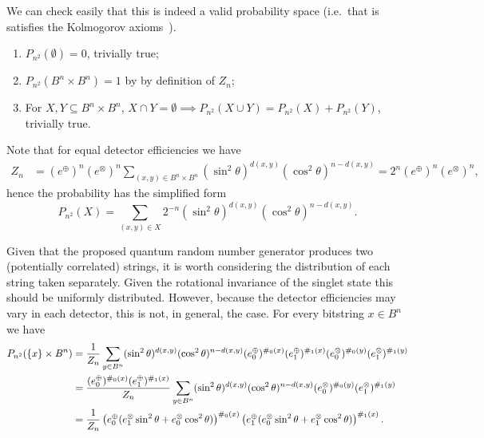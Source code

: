 \documentclass[%
 preprint,
 showpacs,
 showkeys,
 preprintnumbers,
  amsmath,amssymb,
  aps,
 pra,
  longbibliography,
  floatfix,
 ]{revtex4-1}
\newtheorem{Fact}[Theorem]{Fact}
\theoremstyle{definition}
\begin{document}
We can check easily that this is indeed a valid probability space (i.e.\ that is satisfies the Kolmogorov axioms~\cite{Billingsley:1979aa}).
\begin{enumerate}
	\item $P_{n^2}(\emptyset) = 0$, trivially true;
	\item $P_{n^2}(B^n\times B^n) = 1$ by by definition of $Z_n$;
	\item For $X,Y\subseteq B^n\times B^n$, $X\cap Y=\emptyset \implies P_{n^2}(X \cup Y) = P_{n^2}(X) + P_{n^2}(Y)$, trivially true.
\end{enumerate}
\fi
Note that for equal detector efficiencies we have
\begin{align*}
	Z_n&=(e^\oplus)^n(e^\otimes)^n\sum_{(x,y)\in B^n\times B^n}(\sin^2\theta)^{d(x,y)}(\cos^2\theta)^{n-d(x,y)}=2^n(e^\oplus)^n(e^\otimes)^n,
\end{align*}
hence the probability has the simplified form
$$P_{n^2}(X)=\sum_{(x,y)\in X}2^{-n}(\sin^2\theta)^{d(x,y)}(\cos^2\theta)^{n-d(x,y)}.$$

Given that the proposed quantum random number generator produces two (potentially correlated) strings, it is worth considering the distribution of each string taken separately. Given the rotational invariance of the singlet state this should be uniformly distributed. However, because the detector efficiencies may vary in each detector, this is not, in general, the case.
	For every bitstring $x\in B^n$ we have
	\begin{align}
		P_{n^2}(\{x\} \times B^n) &= \frac{1}{Z_n}\sum_{y\in B^n}(\sin^2\theta)^{d(x,y)}(\cos^2\theta)^{n-d(x,y)}(e_0^\oplus)^{\#_0(x)}(e_1^\oplus)^{\#_1(x)}(e_0^\otimes)^{\#_0(y)}(e_1^\otimes)^{\#_1(y)}\notag\\
		&= \frac{(e_0^\oplus)^{\#_0(x)}(e_1^\oplus)^{\#_1(x)}}{Z_n}\sum_{y\in B^n}(\sin^2\theta)^{d(x,y)}(\cos^2\theta)^{n-d(x,y)}(e_0^\otimes)^{\#_0(y)}(e_1^\otimes)^{\#_1(y)}\notag\\
		&= \frac{1}{Z_n}\left(e_0^\oplus (e_1^\otimes\sin^2\theta+e_0^\otimes\cos^2\theta) \right)^{\#_0(x)}\left( e_1^\oplus (e_0^\otimes\sin^2\theta+e_1^\otimes\cos^2\theta) \right)^{\#_1(x)}.\label{discardOneStrDis}
	\end{align}
\end{document}

